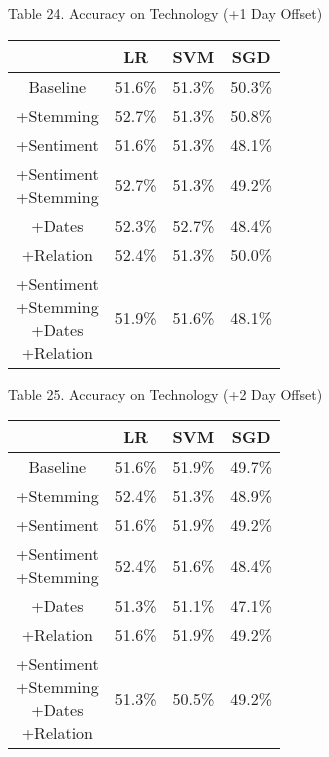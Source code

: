 \documentclass[11pt,a4paper]{article}
\begin{document}
\begin{center}
Table 24. Accuracy on Technology (+1 Day Offset)\\
\begin{tabular}{ |c|c|c|c| }
 \hline
  & LR & SVM & SGD \\
  \hline
  Baseline & 51.6\% & 51.3\% & 50.3\% \\
  \hline
 +Stemming & 52.7\% & 51.3\% & 50.8\% \\
  \hline
 +Sentiment & 51.6\% & 51.3\% & 48.1\% \\
  \hline
  \shortstack{+Sentiment \\ +Stemming} & 52.7\% & 51.3\% & 49.2\%\\
 \hline
 +Dates & 52.3\% & 52.7\% & 48.4\% \\
  \hline
 +Relation & 52.4\% & 51.3\% & 50.0\% \\
  \hline
  \shortstack{+Sentiment \\ +Stemming \\+Dates \\+Relation} & 51.9\% & 51.6\% & 48.1\% \\
 \hline
\end{tabular}
\end{center}

\begin{center}
Table 25. Accuracy on Technology (+2 Day Offset)\\
\begin{tabular}{ |c|c|c|c| }
 \hline
  & LR & SVM & SGD \\
  \hline
  Baseline & 51.6\% & 51.9\% & 49.7\% \\
  \hline
 +Stemming & 52.4\% & 51.3\% & 48.9\% \\
  \hline
 +Sentiment & 51.6\% & 51.9\% & 49.2\% \\
  \hline
  \shortstack{+Sentiment \\ +Stemming} & 52.4\% & 51.6\% & 48.4\%\\
 \hline
 +Dates & 51.3\% & 51.1\% & 47.1\% \\
  \hline
 +Relation & 51.6\% & 51.9\% & 49.2\% \\
  \hline
  \shortstack{+Sentiment \\ +Stemming \\+Dates \\+Relation} & 51.3\% & 50.5\% & 49.2\% \\
 \hline
\end{tabular}
\end{center}
\end{document}

